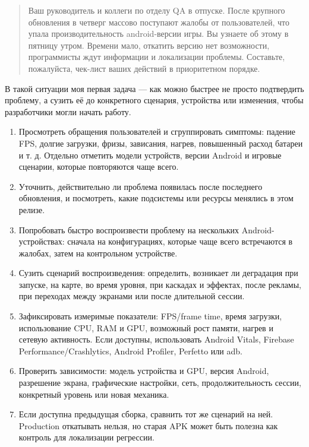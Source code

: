 \documentclass{ZGJournalArticle_2026}
\providecommand{\tightlist}{%
  \setlength{\itemsep}{0pt}\setlength{\parskip}{0pt}}
\begin{document}
\begin{quote}
Ваш руководитель и коллеги по отделу QA в отпуске. После крупного
обновления в четверг массово поступают жалобы от пользователей, что
упала производительность android-версии игры. Вы узнаете об этому в
пятницу утром. Времени мало, откатить версию нет возможности,
программисты ждут информации и локализации проблемы. Составьте,
пожалуйста, чек-лист ваших действий в приоритетном порядке.
\end{quote}

В такой ситуации моя первая задача --- как можно быстрее не просто
подтвердить проблему, а сузить её до конкретного сценария, устройства
или изменения, чтобы разработчики могли начать работу.

\begin{enumerate}
\def\labelenumi{\arabic{enumi}.}
\tightlist
\item
  Просмотреть обращения пользователей и сгруппировать симптомы: падение
  FPS, долгие загрузки, фризы, зависания, нагрев, повышенный расход
  батареи и т. д. Отдельно отметить модели устройств, версии Android и
  игровые сценарии, которые повторяются чаще всего.
\item
  Уточнить, действительно ли проблема появилась после последнего
  обновления, и посмотреть, какие подсистемы или ресурсы менялись в этом
  релизе.
\item
  Попробовать быстро воспроизвести проблему на нескольких
  Android-устройствах: сначала на конфигурациях, которые чаще всего
  встречаются в жалобах, затем на контрольном устройстве.
\item
  Сузить сценарий воспроизведения: определить, возникает ли деградация
  при запуске, на карте, во время уровня, при каскадах и эффектах, после
  рекламы, при переходах между экранами или после длительной сессии.
\item
  Зафиксировать измеримые показатели: FPS/frame time, время загрузки,
  использование CPU, RAM и GPU, возможный рост памяти, нагрев и сетевую
  активность. Если доступны, использовать Android Vitals, Firebase
  Performance/Crashlytics, Android Profiler, Perfetto или adb.
\item
  Проверить зависимости: модель устройства и GPU, версия Android,
  разрешение экрана, графические настройки, сеть, продолжительность
  сессии, конкретный уровень или новая механика.
\item
  Если доступна предыдущая сборка, сравнить тот же сценарий на ней.
  Production откатывать нельзя, но старая APK может быть полезна как
  контроль для локализации регрессии.

\end{enumerate}
\end{document}
